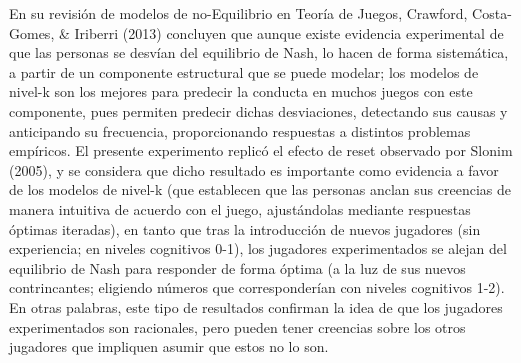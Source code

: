 En su revisión de modelos de no-Equilibrio en Teoría de Juegos, Crawford, Costa-Gomes, & Iriberri (2013) concluyen que aunque existe evidencia experimental de que las personas se desvían del equilibrio de Nash, lo hacen de forma sistemática, a partir de un componente estructural que se puede modelar; los modelos de nivel-k son los mejores para predecir la conducta en muchos juegos con este componente, pues permiten predecir dichas desviaciones, detectando sus causas y anticipando su frecuencia, proporcionando respuestas a distintos problemas empíricos. El presente experimento replicó el efecto de reset observado por Slonim (2005), y se  considera que dicho resultado es importante como evidencia a favor de los modelos de nivel-k (que establecen que las personas anclan sus creencias de manera intuitiva de acuerdo con el juego, ajustándolas mediante respuestas óptimas iteradas), en tanto que tras la introducción de nuevos jugadores (sin experiencia; en niveles cognitivos 0-1), los jugadores experimentados se alejan del equilibrio de Nash para responder de forma óptima (a la luz de sus nuevos contrincantes; eligiendo números que corresponderían con niveles cognitivos 1-2). En otras palabras, este tipo de resultados confirman la idea de que los jugadores experimentados son racionales, pero pueden tener  creencias sobre los otros jugadores que impliquen asumir que estos no lo son.
